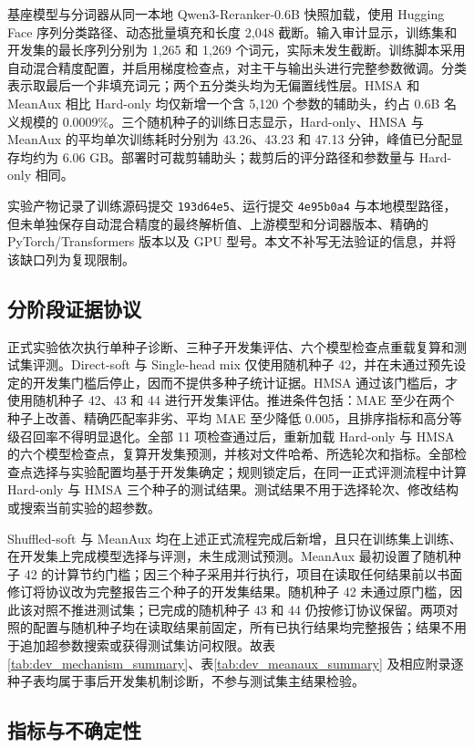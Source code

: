 \documentclass[UTF8,fontset=fandol,a4paper,11pt]{ctexart}
\begin{document}
基座模型与分词器从同一本地 Qwen3-Reranker-0.6B 快照加载，使用 Hugging Face 序列分类路径、动态批量填充和长度 2,048 截断。输入审计显示，训练集和开发集的最长序列分别为 1,265 和 1,269 个词元，实际未发生截断。训练脚本采用自动混合精度配置，并启用梯度检查点，对主干与输出头进行完整参数微调。分类表示取最后一个非填充词元；两个五分类头均为无偏置线性层。HMSA 和 MeanAux 相比 Hard-only 均仅新增一个含 5,120 个参数的辅助头，约占 0.6B 名义规模的 0.0009\%。三个随机种子的训练日志显示，Hard-only、HMSA 与 MeanAux 的平均单次训练耗时分别为 43.26、43.23 和 47.13 分钟，峰值已分配显存均约为 6.06 GB。部署时可裁剪辅助头；裁剪后的评分路径和参数量与 Hard-only 相同。

实验产物记录了训练源码提交 \texttt{193d64e5}、运行提交 \texttt{4e95b0a4} 与本地模型路径，但未单独保存自动混合精度的最终解析值、上游模型和分词器版本、精确的 PyTorch/Transformers 版本以及 GPU 型号。本文不补写无法验证的信息，并将该缺口列为复现限制。

\subsection{分阶段证据协议}

正式实验依次执行单种子诊断、三种子开发集评估、六个模型检查点重载复算和测试集评测。Direct-soft 与 Single-head mix 仅使用随机种子 42，并在未通过预先设定的开发集门槛后停止，因而不提供多种子统计证据。HMSA 通过该门槛后，才使用随机种子 42、43 和 44 进行开发集评估。推进条件包括：MAE 至少在两个种子上改善、精确匹配率非劣、平均 MAE 至少降低 0.005，且排序指标和高分等级召回率不得明显退化。全部 11 项检查通过后，重新加载 Hard-only 与 HMSA 的六个模型检查点，复算开发集预测，并核对文件哈希、所选轮次和指标。全部检查点选择与实验配置均基于开发集确定；规则锁定后，在同一正式评测流程中计算 Hard-only 与 HMSA 三个种子的测试结果。测试结果不用于选择轮次、修改结构或搜索当前实验的超参数。

Shuffled-soft 与 MeanAux 均在上述正式流程完成后新增，且只在训练集上训练、在开发集上完成模型选择与评测，未生成测试预测。MeanAux 最初设置了随机种子 42 的计算节约门槛；因三个种子采用并行执行，项目在读取任何结果前以书面修订将协议改为完整报告三个种子的开发集结果。随机种子 42 未通过原门槛，因此该对照不推进测试集；已完成的随机种子 43 和 44 仍按修订协议保留。两项对照的配置与随机种子均在读取结果前固定，所有已执行结果均完整报告；结果不用于追加超参数搜索或获得测试集访问权限。故表\ref{tab:dev_mechanism_summary}、表\ref{tab:dev_meanaux_summary} 及相应附录逐种子表均属于事后开发集机制诊断，不参与测试集主结果检验。

\subsection{指标与不确定性}
\end{document}
